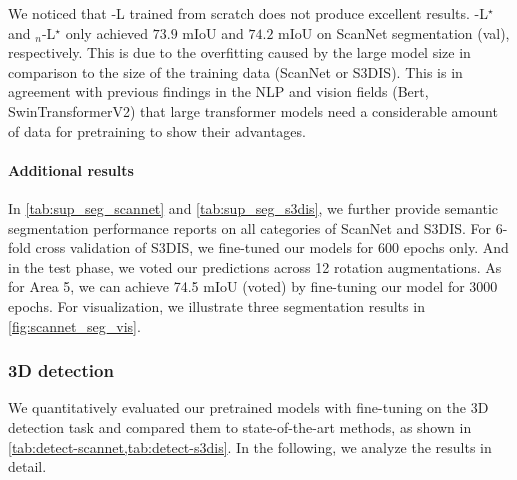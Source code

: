 \documentclass[10pt,twocolumn,letterpaper]{article}
\begin{document}
We noticed that \SST-L trained from scratch does not produce excellent results. \SST-L$^\star$ and \SST$_n$-L$^\star$ only achieved $73.9$ mIoU and $74.2$ mIoU on ScanNet segmentation (val), respectively. This is due to the overfitting caused by the large model size in comparison to the size of the training data (ScanNet or S3DIS). This is in agreement with previous findings in the NLP and vision fields (\eg Bert, SwinTransformerV2) that large transformer models need a considerable amount of data for pretraining to show their advantages.

\paragraph{Additional results}
In \cref{tab:sup_seg_scannet} and \cref{tab:sup_seg_s3dis}, we further provide semantic segmentation performance reports on all categories of ScanNet and S3DIS. For 6-fold cross validation of S3DIS, we fine-tuned our models for 600 epochs only. And in the test phase, we voted our predictions across 12 rotation augmentations. As for Area 5, we can achieve 74.5 mIoU (voted) by fine-tuning our model for 3000 epochs.  For visualization, we illustrate three segmentation results in \cref{fig:scannet_seg_vis}.





\subsubsection{3D detection} \label{subsubsec:exp_det}
We quantitatively evaluated our pretrained models with fine-tuning on the 3D detection task and compared them to state-of-the-art methods, as shown in \cref{tab:detect-scannet,tab:detect-s3dis}. In the following, we analyze the results in detail.
\end{document}

